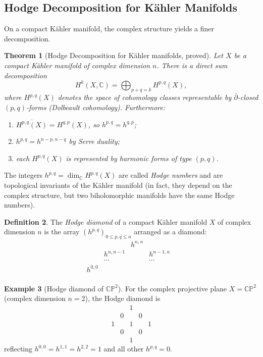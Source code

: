 \documentclass[12pt,a4paper]{amsart}
\newtheorem{theorem}{Theorem}[section]
\theoremstyle{definition}
\newtheorem{definition}[theorem]{Definition}
\newtheorem{example}[theorem]{Example}
\theoremstyle{remark}
\begin{document}
\subsection{Hodge Decomposition for Kähler Manifolds}

On a compact Kähler manifold, the complex structure yields a finer decomposition.

\begin{theorem}[Hodge Decomposition for Kähler manifolds, proved]
\label{thm:hodge-kahler}
Let $X$ be a compact Kähler manifold of complex dimension $n$. There is a direct
sum decomposition
\[
  H^k(X, \mathbb{C}) = \bigoplus_{p+q=k} H^{p,q}(X),
\]
where $H^{p,q}(X)$ denotes the space of cohomology classes representable by
$\bar\partial$-closed $(p,q)$-forms (Dolbeault cohomology). Furthermore:
\begin{enumerate}[label=(\roman*)]
\item $\overline{H^{p,q}(X)} = H^{q,p}(X)$, so $h^{p,q} = h^{q,p}$;
\item $h^{p,q} = h^{n-p,n-q}$ by Serre duality;
\item each $H^{p,q}(X)$ is represented by harmonic forms of type $(p,q)$.
\end{enumerate}
\end{theorem}

The integers $h^{p,q} = \dim_{\mathbb{C}} H^{p,q}(X)$ are called \emph{Hodge numbers}
and are topological invariants of the Kähler manifold (in fact, they depend on the
complex structure, but two biholomorphic manifolds have the same Hodge numbers).

\begin{definition}
The \emph{Hodge diamond} of a compact Kähler manifold $X$ of complex dimension $n$
is the array $(h^{p,q})_{0 \le p,q \le n}$ arranged as a diamond:
\[
\begin{array}{ccccc}
  & & h^{n,n} & & \\
  & h^{n,n-1} & & h^{n-1,n} & \\
  & \cdots & & \cdots & \\
  h^{0,0} & & & & \\
\end{array}
\]
\end{definition}

\begin{example}[Hodge diamond of $\mathbb{CP}^2$]
For the complex projective plane $X = \mathbb{CP}^2$ (complex dimension $n=2$),
the Hodge diamond is
\[
\begin{array}{ccccc}
 & & 1 & & \\
 & 0 & & 0 & \\
 1 & & 1 & & 1 \\
 & 0 & & 0 & \\
 & & 1 & &
\end{array}
\]
reflecting $h^{0,0}=h^{1,1}=h^{2,2}=1$ and all other $h^{p,q}=0$.
\end{example}
\end{document}
